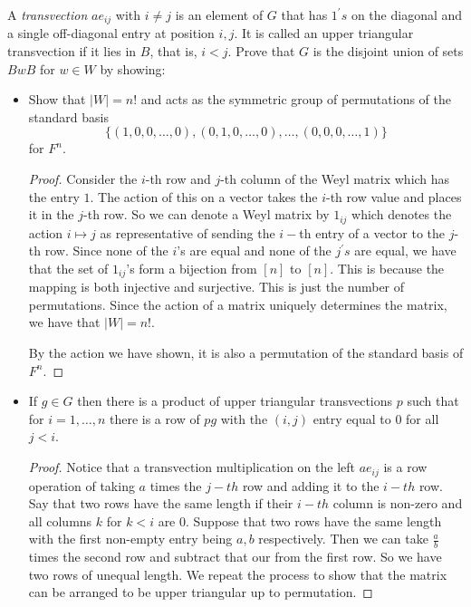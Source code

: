 \documentclass{article}
\begin{document}
A \textit{transvection} $ae_{ij}$ with $i \neq j$ is an element of $G$ that has $1^{\prime}s$ on the diagonal and a single off-diagonal entry at position $i, j$. It is called an upper triangular transvection if it lies in $B$, that is, $i < j$. Prove that $G$ is the disjoint union of sets $BwB$ for $w \in W$ by showing:
    \begin{itemize}
        \item Show that $\lvert W \rvert = n!$ and acts as the symmetric group of permutations of the standard basis
            \begin{equation*}
                \{(1, 0, 0, \ldots , 0), (0, 1, 0, \ldots , 0), \ldots , (0, 0, 0, \ldots , 1)\}
            \end{equation*}
        for $F^{n}$.
            \begin{proof}
                Consider the $i$-th row and $j$-th column of the Weyl matrix which has the entry $1$. The action of this on a vector takes the $i$-th row value and places it in the $j$-th row. So we can denote a Weyl matrix by $1_{ij}$ which denotes the action $i \mapsto j$ as representative of sending the $i-$th entry of a vector to the $j$-th row. Since none of the $i$'s are equal and none of the $j^{\prime}s$ are equal, we have that the set of $1_{ij}$'s form a bijection from $[n]$ to $[n]$. This is because the mapping is both injective and surjective. This is just the number of permutations. Since the action of a matrix uniquely determines the matrix, we have that $\lvert W \rvert = n!$.

                By the action we have shown, it is also a permutation of the standard basis of $F^{n}$.
            \end{proof}

        \item If $g \in G$ then there is a product of upper triangular transvections $p$  such that for $i = 1, \ldots , n$ there is a row of $pg$ with the $(i, j)$ entry equal to $0$ for all $j < i$.
            \begin{proof}
                Notice that a transvection multiplication on the left $ae_{ij}$ is a row operation of taking $a$ times the $j-th$ row and adding it to the $i-th$ row. Say that two rows have the same length if their $i-th$ column is non-zero and all columns $k$ for $k < i$ are $0$. Suppose that two rows have the same length with the first non-empty entry being $a, b$ respectively. Then we can take $\frac{a}{b}$ times the second row and subtract that our from the first row. So we have two rows of unequal length. We repeat the process to show that the matrix can be arranged to be upper triangular up to permutation.
            \end{proof}


\end{itemize}
\end{document}

